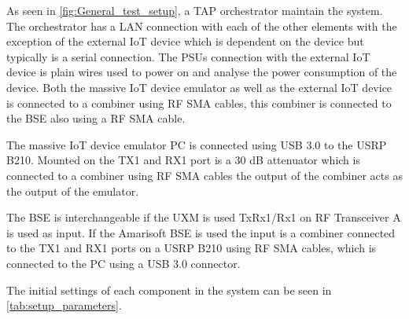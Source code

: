As seen in \autoref{fig:General_test_setup}, a \gls{TAP} orchestrator maintain the system. The orchestrator has a \gls{LAN} connection with each of the other elements with the exception of the external IoT device which is dependent on the device but typically is a serial connection. The \gls{PSU}s connection with the external IoT device is plain wires used to power on and analyse the power consumption of the device. Both the massive IoT device emulator as well as the external IoT device is connected to a combiner using RF SMA cables, this combiner is connected to the \gls{BSE} also using a RF SMA cable. 

The massive IoT device emulator PC is connected using USB 3.0 to the USRP B210. Mounted on the TX1 and RX1 port is a 30 dB attenuator which is connected to a combiner using RF SMA cables the output of the combiner acts as the output of the emulator.

The \gls{BSE} is interchangeable if the UXM is used TxRx1/Rx1 on RF Transceiver A is used as input. If the Amarisoft BSE is used the input is a combiner connected to the TX1 and RX1 ports on a USRP B210 using RF SMA cables, which is connected to the PC using a USB 3.0 connector.

The initial settings of each component in the system can be seen in \autoref{tab:setup_parameters}.

